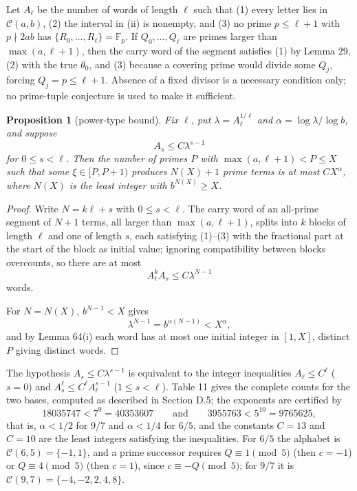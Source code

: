 \documentclass[11pt,reqno]{amsart}
\newtheorem{proposition}[theorem]{Proposition}
\theoremstyle{definition}
\theoremstyle{remark}
\begin{document}
Let \(A_\ell\) be the number of words of length \(\ell\) such that (1)
every letter lies in \(\mathcal C(a,b)\), (2) the interval in (ii) is
nonempty, and (3) no prime \(p\le\ell+1\) with \(p\nmid2ab\) has
\(\{R_0,\ldots,R_\ell\}=\mathbb F_p\). If \(Q_0,\ldots,Q_\ell\) are
primes larger than \(\max(a,\ell+1)\), then the carry word of the
segment satisfies (1) by Lemma 29, (2) with the true \(\theta_0\), and
(3) because a covering prime would divide some \(Q_j\), forcing
\(Q_j=p\le\ell+1\). Absence of a fixed divisor is a necessary condition
only; no prime-tuple conjecture is used to make it sufficient.

\begin{samepage}
\begin{proposition}[power-type bound]\leavevmode\label{thm:65}
Fix \(\ell\), put
\(\lambda=A_\ell^{1/\ell}\) and \(\alpha=\log\lambda/\log b\), and
suppose
\[
A_s\le C\lambda^{s-1}
\]
for \(0\le s<\ell\). Then the number of
primes \(P\) with \(\max(a,\ell+1)<P\le X\) such that some
\(\xi\in[P,P+1)\) produces \(N(X)+1\) prime terms is at most
\(CX^\alpha\), where \(N(X)\) is the least integer with \(b^{N(X)}\ge X\).
\label{thm-end:65}
\end{proposition}
\end{samepage}

\begin{proof}\leavevmode\label{proof:65}
Write \(N=k\ell+s\) with \(0\le s<\ell\). The carry word of
an all-prime segment of \(N+1\) terms, all larger than
\(\max(a,\ell+1)\), splits into \(k\) blocks of length \(\ell\) and one
of length \(s\), each satisfying (1)--(3) with the fractional part at the
start of the block as initial value; ignoring compatibility between
blocks overcounts, so there are at most
\[
A_\ell^kA_s\le
C\lambda^{N-1}
\]
words.

For \(N=N(X)\), \(b^{N-1}<X\) gives
\[
\lambda^{N-1}=b^{\alpha(N-1)}<X^\alpha,
\]
and by Lemma 64(i) each word
has at most one initial integer in \([1,X]\), distinct \(P\) giving
distinct words. \qedhere
\end{proof}

The hypothesis \(A_s\le C\lambda^{s-1}\) is equivalent to the integer
inequalities \(A_\ell\le C^\ell\) (\(s=0\)) and
\(A_s^{\ell}\le C^{\ell}A_\ell^{s-1}\) (\(1\le s<\ell\)). Table 11
gives the complete counts for the two bases, computed as described in
Section D.5; the exponents are certified by
\[
18035747<7^9=40353607\qquad \text{and}\qquad 3955763<5^{10}=9765625,
\]
that is,
\(\alpha<1/2\) for \(9/7\) and \(\alpha<1/4\) for \(6/5\), and the
constants \(C=13\) and \(C=10\) are the least integers satisfying the
inequalities. For \(6/5\) the alphabet is \(\mathcal C(6,5)=\{-1,1\}\),
and a prime successor requires \(Q\equiv1\pmod5\) (then \(c=-1\)) or
\(Q\equiv4\pmod5\) (then \(c=1\)), since \(c\equiv-Q\pmod5\); for
\(9/7\) it is \(\mathcal C(9,7)=\{-4,-2,2,4,8\}\).
\end{document}
